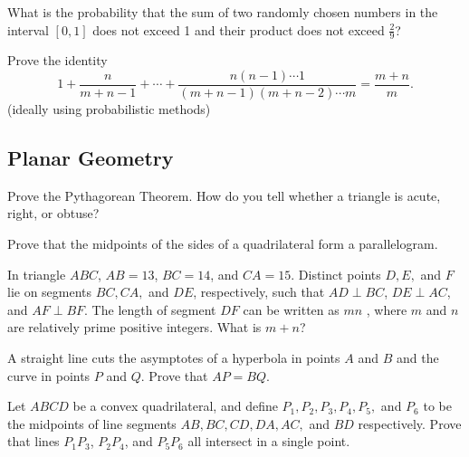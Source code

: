 \documentclass[12pt]{article}
\begin{document}
    \begin{exercise}
        What is the probability that the sum of two randomly chosen numbers in the interval \([0,1]\) does not exceed 1 and their product does not exceed \(\frac29\)?
    \end{exercise}

    \begin{exercise}
        Prove the identity
        \[1+\frac{n}{m+n-1}+\cdots+\frac{n(n-1)\cdots 1}{(m+n-1)(m+n-2)\cdots m}=\frac{m+n}{m}.\]
        (ideally using probabilistic methods)
    \end{exercise}

    \subsection{Planar Geometry}

        \begin{exercise}
            Prove the Pythagorean Theorem. How do you tell whether a triangle is acute, right, or obtuse?  
        \end{exercise}

        \begin{exercise}
            Prove that the midpoints of the sides of a quadrilateral form a parallelogram.
        \end{exercise}
        
        \begin{exercise}
            In triangle $ABC$, $AB = 13$, $BC = 14$, and $CA = 15$. Distinct points $D, E,$ and $F$ lie on segments $BC, CA,$ and $DE$, respectively, such that $AD \perp BC$, $DE \perp AC$, and $AF \perp BF$. The length of segment $DF$ can be written as $mn$ , where $m$ and $n$ are relatively prime positive integers. What is $m + n$?
        \end{exercise}
        
        \begin{exercise}
            A straight line cuts the asymptotes of a hyperbola in points $A$ and $B$ and the curve in points $P$ and $Q$. Prove that $AP = BQ$.   
        \end{exercise}

        \begin{exercise}
            Let $ABCD$ be a convex quadrilateral, and define $P_1, P_2, P_3, P_4, P_5,$ and $P_6$ to be the midpoints of line segments $AB, BC, CD, DA, AC,$ and $BD$ respectively. Prove that lines $P_{1}P_{3}$, $P_{2}P_{4}$, and $P_{5}P_{6}$ all intersect in a single point.
        \end{exercise}
\end{document}
